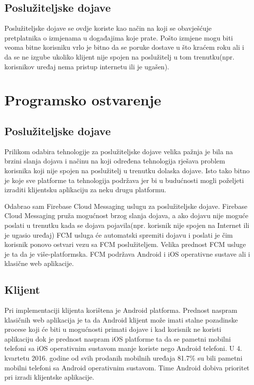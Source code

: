 \documentclass[times, utf8, zavrsni]{fer}
\begin{document}
{\section{Poslužiteljske dojave}
Poslužiteljske dojave se ovdje koriste kao način na koji se obavješćuje pretplatnika o izmjenama u događajima koje prate. Pošto izmjene mogu biti veoma bitne korisniku vrlo je bitno da se poruke dostave u što kraćem roku ali i da se ne izgube ukoliko klijent nije spojen na poslužitelj u tom trenutku(npr. korisnikov uređaj nema pristup internetu ili je ugašen).

\chapter{Programsko ostvarenje}
\label{chp:implementation}

\section{Poslužiteljske dojave}
Prilikom odabira tehnologije za poslužiteljske dojave velika pažnja je bila na brzini slanja dojava i načinu na koji određena tehnologija rješava problem korisnika koji nije spojen na poslužitelj u trenutku dolaska dojave. Isto tako bitno je koje sve platforme ta tehnologija podržava jer bi u budućnosti mogli poželjeti izraditi klijentsku aplikaciju za neku drugu platformu.

Odabrao sam Firebase Cloud Messaging uslugu za poslužiteljske dojave. Firebase Cloud Messaging pruža mogućnost brzog slanja dojava, a ako dojavu nije moguće poslati u trenutku kada se dojava pojavila(npr. korisnik nije spojen na Internet ili je ugasio uređaj) FCM usluga će automatski spremiti dojavu i poslati je čim korisnik ponovo ostvari vezu sa FCM poslužiteljem. Velika prednost FCM usluge je ta da je više-platformska. FCM podržava Android i iOS operativne sustave ali i klasične web aplikacije.

\section{Klijent}
Pri implementaciji klijenta korištena je Android platforma. Prednost naspram klasičnih web aplikacija je ta da Android klijent može imati stalne pozadinske procese koji će biti u mogućnosti primati dojave i kad korisnik ne koristi aplikaciju dok je prednost naspram iOS platforme ta da se pametni mobilni telefoni sa iOS operativnim sustavom manje koriste nego Android telefoni. U 4. kvartetu 2016. godine od svih prodanih mobilnih uređaja 81.7\% \citep{vincent2017} su bili pametni mobilni telefoni sa Android operativnim sustavom. Time Android dobiva prioritet pri izradi klijentske aplikacije.

}
\end{document}
